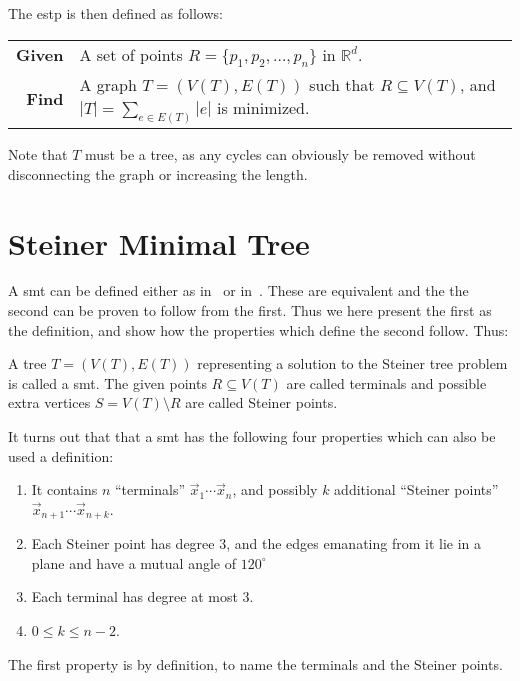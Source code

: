 The \ac{estp} is then defined as follows:
%
\begin{center}
  \begin{tabular}{rp{9cm}}
    \toprule
    \textbf{Given} & A set of points $R = \{ p_1, p_2, \ldots, p_n \}$ in
                     $\mathbb{R}^d$. \\
    \textbf{Find} & A graph $T = (V(T), E(T))$ such that $R \subseteq V(T)$, and
                    $|T| = \sum_{e \in E(T)} |e|$ is minimized. \\
    \bottomrule
  \end{tabular}
\end{center}
%
Note that $T$ must be a tree, as any cycles can obviously be removed
without disconnecting the graph or increasing the length.

\section{Steiner Minimal Tree}
\label{sec:steiner-minimal-tree}

A \ac{smt} can be defined either as in~\textcite{brazil2015} or
in~\textcite{smith1992}. These are equivalent and the the second can be proven
to follow from the first. Thus we here present the first as the definition, and
show how the properties which define the second follow. Thus:
%
\begin{definition}
  A tree $T = (V(T), E(T))$ representing a solution to the Steiner tree problem
  is called a \acl{smt}. The given points $R \subseteq V(T)$ are called
  terminals and possible extra vertices $S = V(T) \setminus R$ are called
  Steiner points.
\end{definition}
%
It turns out that that a \ac{smt} has the following four properties which can
also be used a definition:
%
\begin{definition}
\leavevmode\vspace{-\baselineskip}\par
\begin{enumerate}
\item It contains $n$ ``terminals'' $\vec{x}_1 \cdots \vec{x}_n$, and
 possibly $k$ additional ``Steiner points'' $\vec{x}_{n+1} \cdots
 \vec{x}_{n+k}$.
\item Each Steiner point has degree $3$, and the edges emanating from it lie in a
 plane and have a mutual angle of $120^{\circ}$
\item Each terminal has degree at most $3$.
\item $0 \le k \le n-2$.
\end{enumerate}
\end{definition}
%
The first property is by definition, to name the terminals and the
Steiner points.

